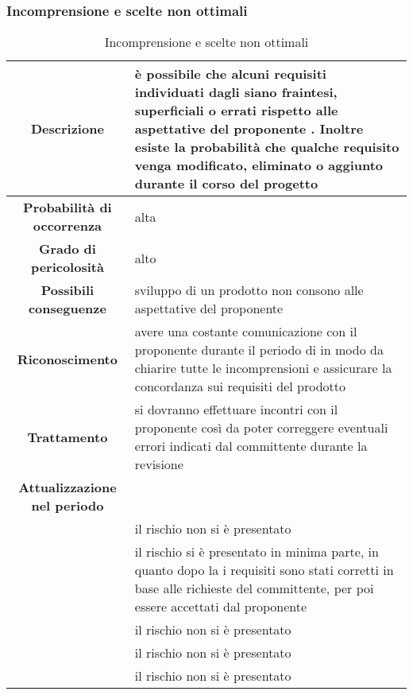 \documentclass[PianoDiProgetto.tex]{subfiles}
\begin{document}
		\subsubsection{Incomprensione e scelte non ottimali}
			\label{sec:lr}
\begin{table}[h]
		\begin{center}
			\begin{tabular}{ | c | p{10cm} |}
				\hline


		 \textbf{Descrizione} & è possibile che alcuni requisiti individuati dagli \ANP{} siano fraintesi, superficiali o errati rispetto alle aspettative del proponente \PROPONENTE{}. Inoltre esiste la probabilità che qualche requisito venga modificato, eliminato o aggiunto durante il corso del progetto \\ \hline
		 \textbf{Probabilità di occorrenza} & alta \\ \hline
		 \textbf{Grado di pericolosità} & alto \\ \hline
		 \textbf{Possibili conseguenze} & sviluppo di un prodotto non consono alle aspettative del proponente \\ \hline
		 \textbf{Riconoscimento} & avere una costante comunicazione con il proponente \PROPONENTE{} durante il periodo di \ARdoc{} in modo da chiarire tutte le incomprensioni e assicurare la concordanza sui requisiti del prodotto \\ \hline
		 \textbf{Trattamento} & si dovranno effettuare incontri con il proponente \PROPONENTE{} così da poter correggere eventuali errori indicati dal committente durante la revisione \\ \hline
		 \textbf{Attualizzazione nel periodo}&

				\\ \hline \textbf{\PerAR} & il rischio non si è presentato
				\\ \hline \textbf{\PerAD}& il rischio si è presentato in minima parte, in quanto dopo la  \RR{} i requisiti sono stati corretti in base alle richieste del committente, per poi essere accettati dal proponente
				\\ \hline \textbf{\PerPA}& il rischio non si è presentato
				\\ \hline \textbf{\PerPD}& il rischio non si è presentato
				\\ \hline \textbf{\PerC}& il rischio non si è presentato \\ \hline

\end{tabular}
		\caption{Incomprensione e scelte non ottimali}
		\end{center}
	\end{table}
\end{document}
